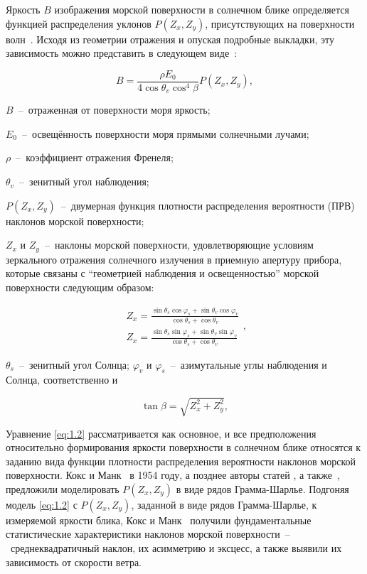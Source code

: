 Яркость $B$ изображения морской поверхности в солнечном блике определяется функцией распределения уклонов $P(Z_{x} ,Z_{y} )$, присутствующих на поверхности волн~\citep{Cox1954, Cox1954a}. Исходя из геометрии отражения и опуская подробные выкладки, эту зависимость можно представить в следующем виде~\citep{Cox1954, Cox1954a, 1988}:


\begin{equation} \label{eq:1.2} 
    B=\frac{\rho E_{0} }{4\cos \theta _{v} \cos ^{4} \beta } P(Z_{x} ,Z_{y} ), 
\end{equation} 


 $B$~--~отраженная от поверхности моря яркость;

\noindent$E_{0}$~--~освещённость поверхности моря прямыми солнечными лучами;

\noindent$\rho$~--~коэффициент отражения Френеля;

\noindent$\theta _{v}$~--~зенитный угол наблюдения;

\noindent$P(Z_{x}, Z_{y})$~--~двумерная функция плотности распределения вероятности (ПРВ) наклонов морской поверхности; 

\noindent$Z_{x} $ и $Z_{y}$~--~наклоны морской поверхности, удовлетворяющие условиям зеркального отражения солнечного излучения в приемную апертуру прибора, которые связаны с ``геометрией наблюдения и освещенностью'' морской поверхности следующим образом:


\begin{equation} \label{eq:1.3}
    \begin{array}{l} {Z_{x} =\frac{\sin \theta _{s} \cos \varphi _{s} +\sin \theta _{v} \cos \varphi _{v} }{\cos \theta _{s} +\cos \theta _{v} } } \\ {Z_{x} =\frac{\sin \theta _{s} \sin \varphi _{s} +\sin \theta _{v} \sin \varphi _{v} }{\cos \theta _{s} +\cos \theta _{v} } } \end{array},
\end{equation}



\noindent$\theta _{s} $~--~зенитный угол Солнца; $\varphi _{v} $ и $\varphi _{s} $~--~азимутальные углы наблюдения и Солнца, соответственно и


\begin{equation} \label{eq:1.4} 
    \tan \beta =\sqrt{Z_{x}^{2} +Z_{y}^{2} } , 
\end{equation} 


Уравнение \eqref{eq:1.2} рассматривается как основное, и все предположения относительно формирования яркости поверхности в солнечном блике относятся к заданию вида функции плотности распределения вероятности наклонов морской поверхности. Кокс и Манк~\citep{Cox1954, Cox1954a} в 1954 году, а позднее авторы статей \citep{Chapron2000, Ebuchi2002}, а также~\citep{Breon2006}, предложили моделировать $P(Z_{x} ,Z_{y} )$ в виде рядов Грамма-Шарлье. Подгоняя модель \eqref{eq:1.2} с $P(Z_{x} ,Z_{y} )$, заданной в виде рядов Грамма-Шарлье, к измеряемой яркости блика, Кокс и Манк~\citep{Cox1954, Cox1954a} получили фундаментальные статистические характеристики наклонов морской поверхности~--~среднеквадратичный наклон, их асимметрию и эксцесс, а также выявили их зависимость от скорости ветра.




